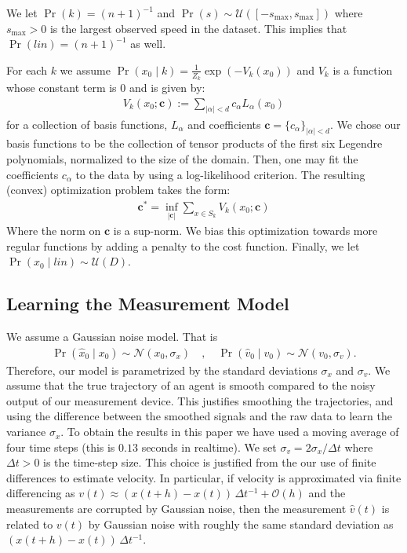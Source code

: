 \documentclass[letterpaper,10pt,conference]{ieeeconf}
\begin{document}
  We let $\Pr(k) = (n+1)^{-1}$ and $\Pr(s) \sim \mathcal{U}( [-s_{\max}, s_{\max} ] )$  where $s_{\max}>0$ is the largest observed speed in the dataset.  
  This implies that $\Pr(lin) = (n+1)^{-1}$ as well.
  
  For each $k$ we assume $\Pr( x_0 \mid k) = \frac{1}{Z_k} \exp( - V_k(x_0) )$ and $V_k$ is a function whose constant term is $0$ and is given by:
  \begin{align*}
  	V_k(x_0; \mathbf{c} ) := \sum_{|\alpha|< d} c_{\alpha} L_{\alpha}( x_0)
  \end{align*}
  for a collection of basis functions, $L_{\alpha}$ and coefficients $\mathbf{c} = \{ c_{\alpha} \}_{|\alpha| < d}$.
  We chose our basis functions to be the collection of tensor products of the first six Legendre polynomials, normalized to the size of the domain.
  Then, one may fit the coefficients $c_{\alpha}$ to the data by using a log-likelihood criterion.
  The resulting (convex) optimization problem takes the form:
  \begin{align*}
  	\mathbf{c}^* = \inf_{ |\mathbf{c}| } \sum_{x \in S_k} V_k( x_0; \mathbf{c})
  \end{align*}
  Where the norm on $\mathbf{c}$ is a sup-norm.
  We bias this optimization towards more regular functions by adding a penalty to the cost function.
    Finally, we let $\Pr( x_0 \mid lin) \sim \mathcal{U}(D)$.
  
  \subsection{Learning the Measurement Model}
  We assume a Gaussian noise model.  
  That is
  \begin{align*}
  	\Pr( \hat{x}_0 \mid x_0 ) \sim \mathcal{N}( x_0 , \sigma_x) \quad, \quad \Pr( \hat{v}_0 \mid v_0 ) \sim \mathcal{N}( v_0, \sigma_v).
  \end{align*}
  Therefore, our model is parametrized by the standard deviations $\sigma_x$ and $\sigma_v$.
  We assume that the true trajectory of an agent is smooth compared to the noisy output of our measurement device.
  This justifies smoothing the trajectories, and using the difference between the smoothed signals and the raw data to learn the variance $\sigma_x$.
  To obtain the results in this paper we have used a moving average of four time steps (this is $0.13$ seconds in realtime).
  We set $\sigma_v = 2 \sigma_x / \Delta t$ where $\Delta t > 0$ is the time-step size.  
  This choice is justified from the our use of finite differences to estimate velocity.
  In particular, if velocity is approximated via finite differencing as $v(t) \approx (x(t+h) - x(t))\,\Delta t^{-1} + \mathcal{O}(h)$ and the measurements are corrupted by Gaussian noise, then the measurement $\hat{v}(t)$ is related to $v(t)$ by Gaussian noise with roughly the same standard deviation as $(x(t+h) - x(t))\,\Delta t^{-1}$.
  
\end{document}
